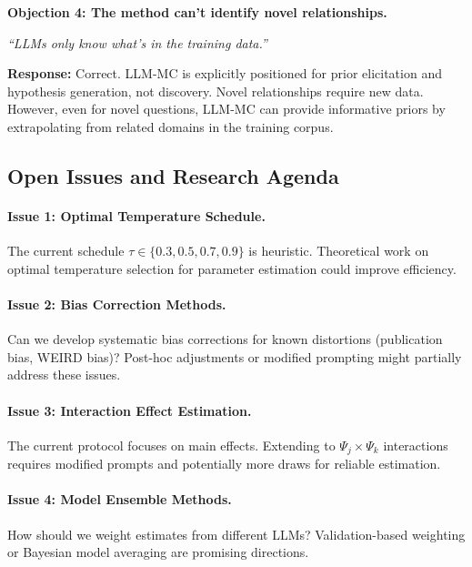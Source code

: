 \begin{tcolorbox}[colback=red!5!white, colframe=red!75!black,
    title=\textbf{Critical Foundations: Objections and Responses}]
\medskip

\textbf{Objection 4: The method can't identify novel relationships.}

\textit{``LLMs only know what's in the training data.''}

\textbf{Response:} Correct. LLM-MC is explicitly positioned for prior elicitation
and hypothesis generation, not discovery. Novel relationships require new data.
However, even for novel questions, LLM-MC can provide informative priors by
extrapolating from related domains in the training corpus.

\end{tcolorbox}


\subsection{Open Issues and Research Agenda}
\label{sec:AN-openissues}

\paragraph{Issue 1: Optimal Temperature Schedule.}
The current schedule $\tau \in \{0.3, 0.5, 0.7, 0.9\}$ is heuristic.
Theoretical work on optimal temperature selection for parameter estimation
could improve efficiency.

\paragraph{Issue 2: Bias Correction Methods.}
Can we develop systematic bias corrections for known distortions
(publication bias, WEIRD bias)? Post-hoc adjustments or modified
prompting might partially address these issues.

\paragraph{Issue 3: Interaction Effect Estimation.}
The current protocol focuses on main effects. Extending to
$\Psi_j \times \Psi_k$ interactions requires modified prompts
and potentially more draws for reliable estimation.

\paragraph{Issue 4: Model Ensemble Methods.}
How should we weight estimates from different LLMs?
Validation-based weighting or Bayesian model averaging
are promising directions.

